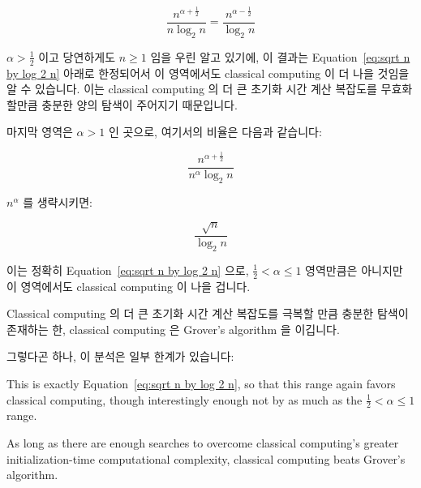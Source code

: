 \begin{equation}
	\frac{n^{\alpha + \frac{1}{2}}}{n \log_2 n} =
	\frac{n^{\alpha - \frac{1}{2}}}{\log_2 n}
\end{equation}

$\alpha > \frac{1}{2}$ 이고 당연하게도 $n \geq 1$ 임을 우린 알고 있기에, 이
결과는
Equation~\ref{eq:sqrt n by log 2 n} 아래로 한정되어서 이 영역에서도 classical
computing 이 더 나을 것임을 알 수 있습니다.
이는 classical computing 의 더 큰 초기화 시간 계산 복잡도를 무효화 할만큼
충분한 양의 탐색이 주어지기 때문입니다.

마지막 영역은 $\alpha > 1$ 인 곳으로, 여기서의 비율은 다음과 같습니다:

\begin{equation}
	\frac{n^{\alpha + \frac{1}{2}}}{n^\alpha \log_2 n}
\end{equation}

$n^\alpha$ 를 생략시키면:

\begin{equation}
	\frac{\sqrt n}{\log_2 n}
\end{equation}

이는 정확히
Equation~\ref{eq:sqrt n by log 2 n} 으로, $\frac{1}{2} < \alpha \leq 1$
영역만큼은 아니지만 이 영역에서도 classical computing 이 나을 겁니다.

Classical computing 의 더 큰 초기화 시간 계산 복잡도를 극복할 만큼 충분한
탐색이 존재하는 한, classical computing 은 Grover's algorithm 을 이깁니다.

그렇다곤 하나, 이 분석은 일부 한계가 있습니다:
\iffalse

This is exactly
Equation~\ref{eq:sqrt n by log 2 n}, so that this range again
favors classical computing, though interestingly enough not by
as much as the 
$\frac{1}{2} < \alpha \leq 1$ range.

As long as there are enough searches to overcome classical computing's
greater initialization-time computational complexity, classical computing
beats Grover's algorithm.


